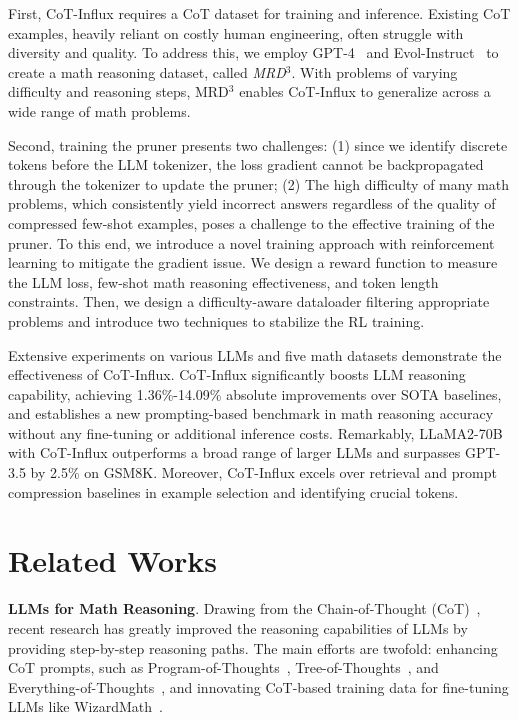 First,  {CoT-Influx} requires a CoT dataset for training and inference. Existing CoT examples,  heavily reliant on costly human engineering, often struggle with diversity and quality.  To address this, we employ GPT-4~\cite{gpt4} and Evol-Instruct~\cite{xu2023wizardlm} to create a math reasoning dataset, called \textit{MRD$^3$}.
With problems of varying difficulty and reasoning steps, MRD$^3$ enables  {CoT-Influx} to generalize across a wide range of math problems. 

Second, training the pruner presents two challenges: (1) since we identify discrete tokens before the LLM tokenizer, the loss gradient cannot be backpropagated through the tokenizer to update the pruner; (2) The high difficulty of many math problems, which consistently yield incorrect answers regardless of the quality of compressed few-shot examples, poses a challenge to the effective training of the pruner. To this end, we introduce a novel training approach with reinforcement learning to mitigate the gradient issue. We design a reward function to measure the LLM loss, few-shot math reasoning effectiveness, and token length constraints. Then, we design a difficulty-aware dataloader filtering appropriate problems and introduce two techniques to stabilize the RL training. 

Extensive experiments on various LLMs and five math datasets demonstrate the effectiveness of {CoT-Influx}. {CoT-Influx} significantly boosts LLM reasoning capability,  achieving 1.36\%-14.09\% absolute improvements over SOTA baselines, and establishes a new prompting-based benchmark in math reasoning accuracy without any fine-tuning or additional inference costs. Remarkably, LLaMA2-70B with {CoT-Influx} outperforms a broad range of larger LLMs and surpasses GPT-3.5 by 2.5\% on GSM8K. Moreover, {CoT-Influx}  excels over retrieval and prompt compression baselines in example selection and identifying crucial tokens.

\section{Related Works}

\textbf{LLMs for Math Reasoning}. Drawing from the Chain-of-Thought (CoT)~\cite{cot}, recent research has greatly improved the reasoning capabilities of LLMs by providing step-by-step reasoning paths. The main efforts are twofold: enhancing CoT prompts, such as Program-of-Thoughts~\cite{pot}, Tree-of-Thoughts~\cite{treeofthought}, and Everything-of-Thoughts~\cite{ding2023everything}, and innovating CoT-based training data for fine-tuning LLMs like WizardMath~\cite{luo2023wizardmath}. 

